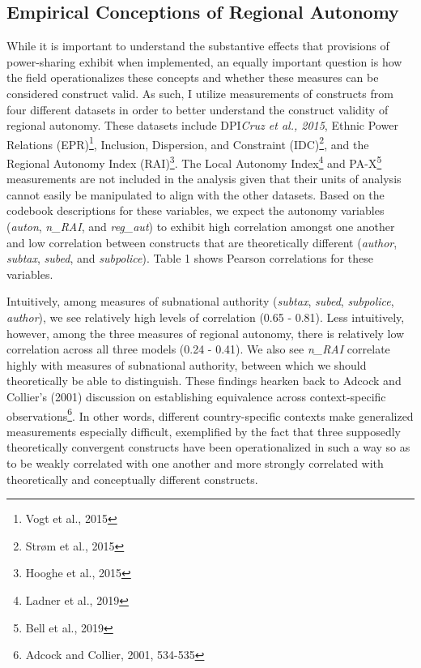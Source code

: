 \documentclass[12pt]{article}
\begin{document}
\subsection{Empirical Conceptions of Regional Autonomy}
While it is important to understand the substantive effects that provisions of power-sharing exhibit when implemented, an equally important question is how the field operationalizes these concepts and whether these measures can be considered construct valid. As such, I utilize measurements of constructs from four different datasets in order to better understand the construct validity of regional autonomy. These datasets include DPI\textit{Cruz et al., 2015}, Ethnic Power Relations (EPR)\footnote{Vogt et al., 2015}, Inclusion, Dispersion, and Constraint (IDC)\footnote{Strøm et al., 2015}, and the Regional Autonomy Index (RAI)\footnote{Hooghe et al., 2015}. The Local Autonomy Index\footnote{Ladner et al., 2019} and PA-X\footnote{Bell et al., 2019} measurements are not included in the analysis given that their units of analysis cannot easily be manipulated to align with the other datasets. Based on the codebook descriptions for these variables, we expect the autonomy variables (\textit{auton}, \textit{n\_RAI}, and \textit{reg\_aut}) to exhibit high correlation amongst one another and low correlation between constructs that are theoretically different (\textit{author}, \textit{subtax}, \textit{subed}, and \textit{subpolice}). Table 1 shows Pearson correlations for these variables.

Intuitively, among measures of subnational authority (\textit{subtax}, \textit{subed}, \textit{subpolice}, \textit{author}), we see relatively high levels of correlation (0.65 - 0.81). Less intuitively, however, among the three measures of regional autonomy, there is relatively low correlation across all three models (0.24 - 0.41). We also see \textit{n\_RAI} correlate highly with measures of subnational authority, between which we should theoretically be able to distinguish. These findings hearken back to Adcock and Collier's (2001) discussion on establishing equivalence across context-specific observations\footnote{Adcock and Collier, 2001, 534-535}. In other words, different country-specific contexts make generalized measurements especially difficult, exemplified by the fact that three supposedly theoretically convergent constructs have been operationalized in such a way so as to be weakly correlated with one another and more strongly correlated with theoretically and conceptually different constructs.
\end{document}

